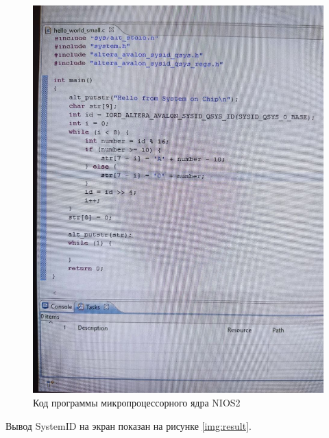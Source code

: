 \begin{figure}[H]
	\begin{center}
		\includegraphics[scale=0.3]{img/code.jpg}
	\end{center}
	\captionsetup{justification=centering}
	\caption{Код программы микропроцессорного ядра NIOS2}
	\label{img:code}
\end{figure}

Вывод SystemID на экран показан на рисунке \ref{img:result}.

